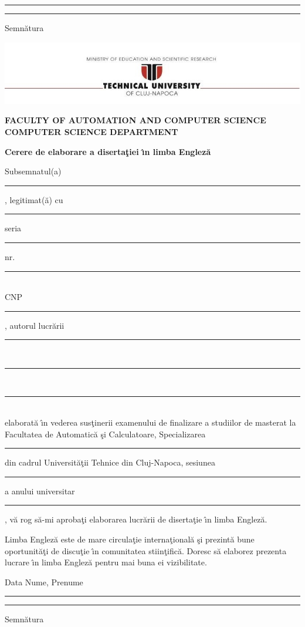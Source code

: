 \documentclass[12pt,a4paper,twoside]{report}
\newcommand{\department}{\bf FACULTY OF AUTOMATION AND COMPUTER SCIENCE\\
COMPUTER SCIENCE DEPARTMENT}
\newcommand{\utcnlogo}{\includegraphics[width=15cm]{img/tucn.jpg}}
\newcommand{\uline}[1]{\rule[0pt]{#1}{0.4pt}}
\begin{document}
\uline{3cm} \hspace{5cm} \uline{5cm}

\vspace{1cm}
\hspace{9.4cm}Semn\u{a}tura

\thispagestyle{empty}

\thispagestyle{empty}
\newpage

\begin{center}
\utcnlogo

\department
\end{center}

\begin{center}
{\bf
Cerere de elaborare a diserta\c{t}iei \^{\i}n limba Englez\u{a}}
\end{center}
\vspace{0.5cm}

Subsemnatul(a) \\
\uline{14.8cm}, 
legitimat(\u{a}) cu \uline{4cm} seria \uline{3cm} nr. \uline{4cm}\\
CNP \uline{9cm}, autorul lucr\u{a}rii \uline{2.8cm}\\
\uline{16cm}\\
\uline{16cm}\\
elaborat\u{a} \^{\i}n vederea sus\c{t}inerii examenului de finalizare a studiilor de masterat la Facultatea de Automatic\u{a} \c{s}i Calculatoare, Specializarea \uline{7cm} din cadrul Universit\u{a}\c{t}ii Tehnice din Cluj-Napoca, sesiunea \uline{4cm} a anului universitar \uline{3cm}, v\u{a} rog s\u{a}-mi aproba\c{t}i elaborarea lucr\u{a}rii de diserta\c{t}ie \^{\i}n limba Englez\u{a}.

Limba Englez\u{a} este de mare circula\c{t}ie interna\c{t}ional\u{a} \c{s}i prezint\u{a} bune oportunit\u{a}\c{t}i de discu\c{t}ie \^{\i}n comunitatea stiin\c{t}ific\u{a}. Doresc s\u{a} elaborez prezenta lucrare \^{\i}n limba Englez\u{a} pentru mai buna ei vizibilitate.

\vspace{0.5cm}

Data \hspace{8cm} Nume, Prenume

\vspace{0.5cm}

\uline{3cm} \hspace{5cm} \uline{5cm}

\vspace{0.5cm}
\hspace{9.4cm}Semn\u{a}tura
\end{document}
